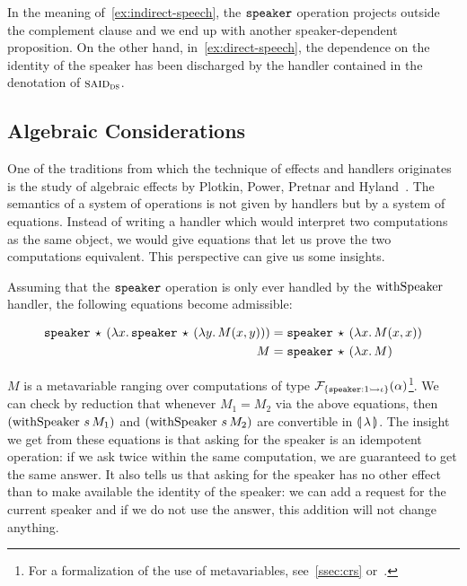 In the meaning of~\eqref{ex:indirect-speech}, the $\mathtt{speaker}$ operation
projects outside the complement clause and we end up with another
speaker-dependent proposition. On the other hand,
in~\eqref{ex:direct-speech}, the dependence on the identity of the speaker
has been discharged by the handler contained in the denotation of
$\textsc{said}_{\textsc{ds}}$.


\subsection{Algebraic Considerations}
\label{ssec:algebraic-deixis}

One of the traditions from which the technique of effects and handlers
originates is the study of algebraic effects by Plotkin, Power, Pretnar and
Hyland~\cite{hyland2006combining,plotkin2009handlers,pretnar2010logic,plotkin2013handling}.
The semantics of a system of operations is not given by handlers but by a
system of equations. Instead of writing a handler which would interpret two
computations as the same object, we would give equations that let us prove
the two computations equivalent. This perspective can give us some
insights.

Assuming that the $\mathtt{speaker}$ operation is only ever handled by the
$\operatorname{withSpeaker}$ handler, the following equations become admissible:

\begin{align*}
  \mathtt{speaker}\,\star\,(\lambda x.\, \mathtt{speaker}\,\star\,(\lambda y.\, M(x,y)))
  &= \mathtt{speaker}\,\star\,(\lambda x.\, M(x,x)) \\
  M &= \mathtt{speaker}\,\star\,(\lambda x.\, M)
\end{align*}

$M$ is a metavariable ranging over computations of type
$\mathcal{F}_{\{ \mathtt{speaker} : 1 \rightarrowtail \iota \}}(\alpha)$\footnote{For a
  formalization of the use of metavariables, see~\ref{ssec:crs}
  or~\cite{klop1993combinatory}.}. We can check by reduction that whenever
$M_1 = M_2$ via the above equations, then $(\operatorname{withSpeaker}\,s\,M_1)$
and $(\operatorname{withSpeaker}\,s\,M_2)$ are convertible in
$\llparenthesis \, \lambda \, \rrparenthesis$. The insight we get from these equations is that asking
for the speaker is an idempotent operation: if we ask twice within the same
computation, we are guaranteed to get the same answer. It also tells us
that asking for the speaker has no other effect than to make available the
identity of the speaker: we can add a request for the current speaker and
if we do not use the answer, this addition will not change anything.

